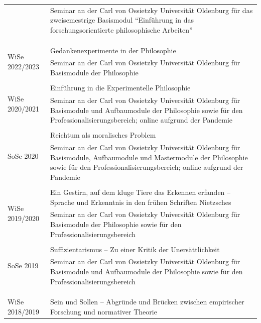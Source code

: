 \documentclass[a4paper,10pt]{article}
\begin{document}
\begin{longtable}{p{2.5cm}p{11cm}}
& \footnotesize{Seminar an der Carl von Ossietzky Universität Oldenburg für das zweisemestrige Basismodul \enquote{Einführung in das forschungsorientierte philosophische Arbeiten}}\\
\\
\\
\\
\multirow{2}{2.5cm}{\footnotesize{WiSe 2022/2023}} & Gedankenexperimente in der Philosophie\\
& \footnotesize{Seminar an der Carl von Ossietzky Universität Oldenburg für Basismodule der Philosophie}\\
\\
\multirow{2}{2.5cm}{\footnotesize{WiSe 2020/2021}} & Einführung in die Experimentelle Philosophie\\
& \footnotesize{Seminar an der Carl von Ossietzky Universität Oldenburg für Basismodule und Aufbaumodule der Philosophie sowie für den Professionalisierungsbereich; online aufgrund der Pandemie}\\
\\
\multirow{2}{2.5cm}{\footnotesize{SoSe 2020}} & Reichtum als moralisches Problem\\
& \footnotesize{Seminar an der Carl von Ossietzky Universität Oldenburg für Basismodule, Aufbaumodule und Mastermodule der Philosophie sowie für den Professionalisierungsbereich; online aufgrund der Pandemie}\\
\\
\multirow{2}{2.5cm}{\footnotesize{WiSe 2019/2020}} & Ein Gestirn, auf dem kluge Tiere das Erkennen erfanden -- Sprache und Erkenntnis in den frühen Schriften Nietzsches\\
& \footnotesize{Seminar an der Carl von Ossietzky Universität Oldenburg für Basismodule der Philosophie sowie für den Professionalisierungsbereich}\\
\\
\multirow{2}{2.5cm}{\footnotesize{SoSe 2019}} & Suffizientarismus -- Zu einer Kritik der Unersättlichkeit\\
& \footnotesize{Seminar an der Carl von Ossietzky Universität Oldenburg für Basismodule und Aufbaumodule der Philosophie sowie für den Professionalisierungsbereich}\\
\\
\\ %
\\ %
\multirow{2}{2.5cm}{\footnotesize{WiSe 2018/2019}} & Sein und Sollen -- Abgründe und Brücken zwischen empirischer Forschung und normativer Theorie\\

\end{longtable}
\end{document}

